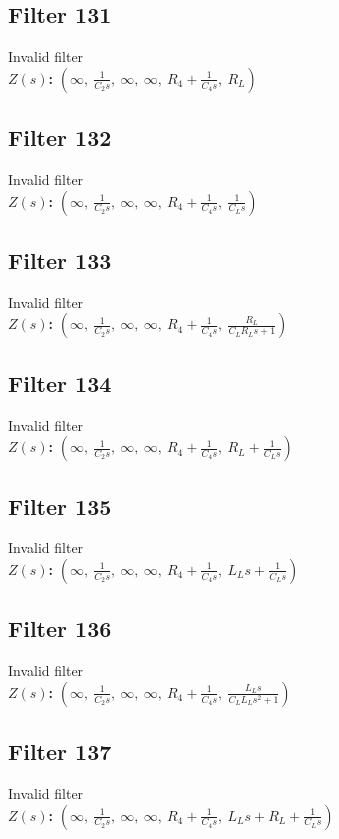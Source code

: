 \documentclass{article}
\begin{document}
\subsection*{Filter 131}
Invalid filter \\ 
\textbf{$Z(s)$:} $\left( \infty, \  \frac{1}{C_{2} s}, \  \infty, \  \infty, \  R_{4} + \frac{1}{C_{4} s}, \  R_{L}\right)$ \\ 
\subsection*{Filter 132}
Invalid filter \\ 
\textbf{$Z(s)$:} $\left( \infty, \  \frac{1}{C_{2} s}, \  \infty, \  \infty, \  R_{4} + \frac{1}{C_{4} s}, \  \frac{1}{C_{L} s}\right)$ \\ 
\subsection*{Filter 133}
Invalid filter \\ 
\textbf{$Z(s)$:} $\left( \infty, \  \frac{1}{C_{2} s}, \  \infty, \  \infty, \  R_{4} + \frac{1}{C_{4} s}, \  \frac{R_{L}}{C_{L} R_{L} s + 1}\right)$ \\ 
\subsection*{Filter 134}
Invalid filter \\ 
\textbf{$Z(s)$:} $\left( \infty, \  \frac{1}{C_{2} s}, \  \infty, \  \infty, \  R_{4} + \frac{1}{C_{4} s}, \  R_{L} + \frac{1}{C_{L} s}\right)$ \\ 
\subsection*{Filter 135}
Invalid filter \\ 
\textbf{$Z(s)$:} $\left( \infty, \  \frac{1}{C_{2} s}, \  \infty, \  \infty, \  R_{4} + \frac{1}{C_{4} s}, \  L_{L} s + \frac{1}{C_{L} s}\right)$ \\ 
\subsection*{Filter 136}
Invalid filter \\ 
\textbf{$Z(s)$:} $\left( \infty, \  \frac{1}{C_{2} s}, \  \infty, \  \infty, \  R_{4} + \frac{1}{C_{4} s}, \  \frac{L_{L} s}{C_{L} L_{L} s^{2} + 1}\right)$ \\ 
\subsection*{Filter 137}
Invalid filter \\ 
\textbf{$Z(s)$:} $\left( \infty, \  \frac{1}{C_{2} s}, \  \infty, \  \infty, \  R_{4} + \frac{1}{C_{4} s}, \  L_{L} s + R_{L} + \frac{1}{C_{L} s}\right)$ \\ 
\end{document}
